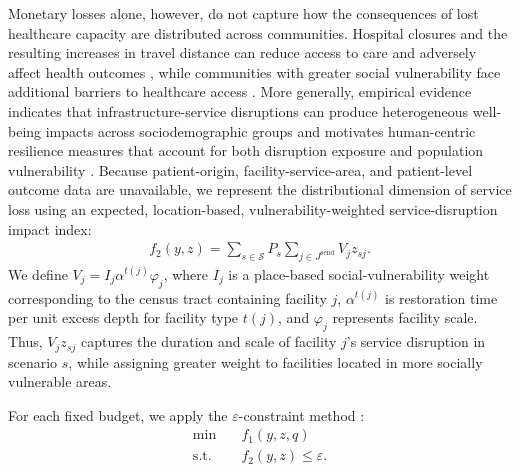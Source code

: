\documentclass[preprint,11pt,authoryear]{elsarticle}
\begin{document}
Monetary losses alone, however, do not capture how the consequences of
lost healthcare capacity are distributed across communities. Hospital closures
and the resulting increases in travel distance can reduce access to care and
adversely affect health outcomes
\citep{buchmueller_how_2006,khushalani_impact_2023}, while communities with
greater social vulnerability face additional barriers to healthcare access
\citep{alrifai_state-level_2022,rickless_social_2023}.
More generally, empirical
evidence indicates that infrastructure-service disruptions can produce
heterogeneous well-being impacts across sociodemographic groups and motivates
human-centric resilience measures that account for both disruption exposure
and population vulnerability \citep{dargin_human-centric_2020}. Because patient-origin, facility-service-area, and patient-level outcome data
are unavailable, we represent the distributional dimension of service loss
using an expected, location-based, vulnerability-weighted service-disruption impact index:
\begin{align}
 f_2(y,z)
 = \sum_{s\in\mathcal{S}}P_s
 \sum_{j\in J^{\mathrm{send}}}V_j z_{sj}.
 \label{eq:f2}
\end{align}
We define $V_j=I_j\alpha^{t(j)}\varphi_j$, where $I_j$ is a
place-based social-vulnerability weight corresponding to the census tract
containing facility $j$, $\alpha^{t(j)}$ is restoration time per unit excess depth for facility type $t(j)$, and $\varphi_j$ represents facility scale.  Thus, $V_jz_{sj}$ captures the duration and scale of facility $j$'s service disruption in scenario $s$, while assigning greater weight to facilities located in more socially vulnerable areas.

For each fixed budget, we apply the $\varepsilon$-constraint method
\citep{ehrgott2005multicriteria,cohon1978multiobjective,
mavrotas2009effective}:
\begin{align}
 \nonumber \min \quad & f_1(y,z,q) \\
 \text{s.t.}\quad & f_2(y,z)\leq \varepsilon.
 \label{eq:epsilon}
\end{align}
\end{document}
